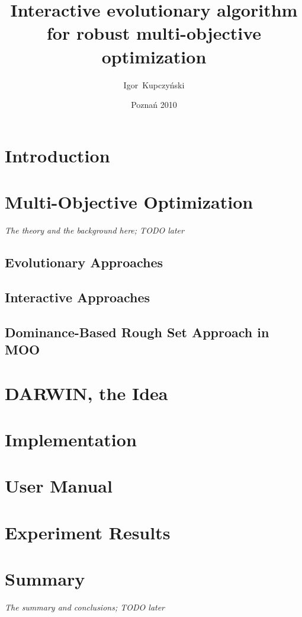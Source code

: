 \documentclass[a4paper,english,thesis]{dcsbook}
\author{Igor~Kupczy\'nski}
\date{Pozna\'n 2010}
\title{Interactive evolutionary algorithm \\ for robust multi-objective
  optimization}
\begin{document}
\maketitle
\frontmatter
\tableofcontents{}
\mainmatter

\chapter{Introduction}

\chapter{Multi-Objective Optimization}
\textit{The theory and the background here; TODO later}
\section{Evolutionary Approaches}
\section{Interactive Approaches}
\section{Dominance-Based Rough Set Approach in MOO}

\chapter{DARWIN, the Idea}

\chapter{Implementation}

\chapter{User Manual}

\chapter{Experiment Results}


\chapter{Summary}
\textit{The summary and conclusions; TODO later}

\backmatter



\end{document}
